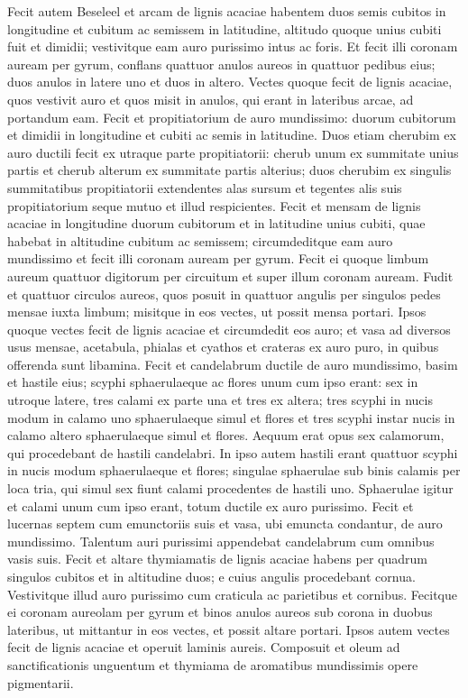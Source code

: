 \begin{biblechapter}  
\verse Fecit autem Beseleel et arcam de lignis acaciae habentem duos semis cubitos in longitudine et cubitum ac semissem in latitudine, altitudo quoque unius cubiti fuit et dimidii; vestivitque eam auro purissimo intus ac foris.  
\verse Et fecit illi coronam auream per gyrum, 
\verse conflans quattuor anulos aureos in quattuor pedibus eius; duos anulos in latere uno et duos in altero. 
\verse Vectes quoque fecit de lignis acaciae, quos vestivit auro 
\verse et quos misit in anulos, qui erant in lateribus arcae, ad portandum eam. 
\verse Fecit et propitiatorium de auro mundissimo: duorum cubitorum et dimidii in longitudine et cubiti ac semis in latitudine. 
\verse Duos etiam cherubim ex auro ductili fecit ex utraque parte propitiatorii: 
\verse cherub unum ex summitate unius partis et cherub alterum ex summitate partis alterius; duos cherubim ex singulis summitatibus propitiatorii 
\verse extendentes alas sursum et tegentes alis suis propitiatorium seque mutuo et illud respicientes. 
\verse Fecit et mensam de lignis acaciae in longitudine duorum cubitorum et in latitudine unius cubiti, quae habebat in altitudine cubitum ac semissem; 
\verse circumdeditque eam auro mundissimo et fecit illi coronam auream per gyrum.  
\verse Fecit ei quoque limbum aureum quattuor digitorum per circuitum et super illum coronam auream. 
\verse Fudit et quattuor circulos aureos, quos posuit in quattuor angulis per singulos pedes mensae 
\verse iuxta limbum; misitque in eos vectes, ut possit mensa portari. 
\verse Ipsos quoque vectes fecit de lignis acaciae et circumdedit eos auro; 
\verse et vasa ad diversos usus mensae, acetabula, phialas et cyathos et crateras ex auro puro, in quibus offerenda sunt libamina. 
\verse Fecit et candelabrum ductile de auro mundissimo, basim et hastile eius; scyphi sphaerulaeque ac flores unum cum ipso erant: 
\verse sex in utroque latere, tres calami ex parte una et tres ex altera; 
\verse tres scyphi in nucis modum in calamo uno sphaerulaeque simul et flores et tres scyphi instar nucis in calamo altero sphaerulaeque simul et flores. Aequum erat opus sex calamorum, qui procedebant de hastili candelabri. 
\verse In ipso autem hastili erant quattuor scyphi in nucis modum sphaerulaeque et flores; 
\verse singulae sphaerulae sub binis calamis per loca tria, qui simul sex fiunt calami procedentes de hastili uno. 
\verse Sphaerulae igitur et calami unum cum ipso erant, totum ductile ex auro purissimo. 
\verse Fecit et lucernas septem cum emunctoriis suis et vasa, ubi emuncta condantur, de auro mundissimo. 
\verse Talentum auri purissimi appendebat candelabrum cum omnibus vasis suis. 
\verse Fecit et altare thymiamatis de lignis acaciae habens per quadrum singulos cubitos et in altitudine duos; e cuius angulis procedebant cornua. 
\verse Vestivitque illud auro purissimo cum craticula ac parietibus et cornibus. 
\verse Fecitque ei coronam aureolam per gyrum et binos anulos aureos sub corona in duobus lateribus, ut mittantur in eos vectes, et possit altare portari. 
\verse Ipsos autem vectes fecit de lignis acaciae et operuit laminis aureis. 
\verse Composuit et oleum ad sanctificationis unguentum et thymiama de aromatibus mundissimis opere pigmentarii. 
\end{biblechapter}

